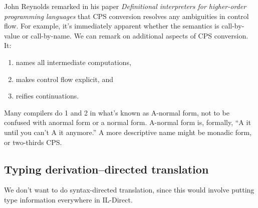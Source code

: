 John Reynolds remarked in his paper \emph{Definitional interpreters for higher-order
programming languages} that CPS conversion resolves any ambiguities in control flow. For example,
it's immediately apparent whether the semantics is call-by-value or call-by-name. We can remark
on additional aspects of CPS conversion. It:
\begin{enumerate}[1.]
  \item names all intermediate computations,
  \item makes control flow explicit, and
  \item reifies continuations.
\end{enumerate}

Many compilers do 1 and 2 in what's known as A-normal form, not to be confused with anormal
form or a normal form. A-normal form is, formally, ``A it until you can't A it anymore.''
A more descriptive name might be monadic form, or two-thirds CPS.

\subsection{Typing derivation--directed translation}
We don't want to do syntax-directed translation, since this would involve putting type
information everywhere in IL-Direct.
